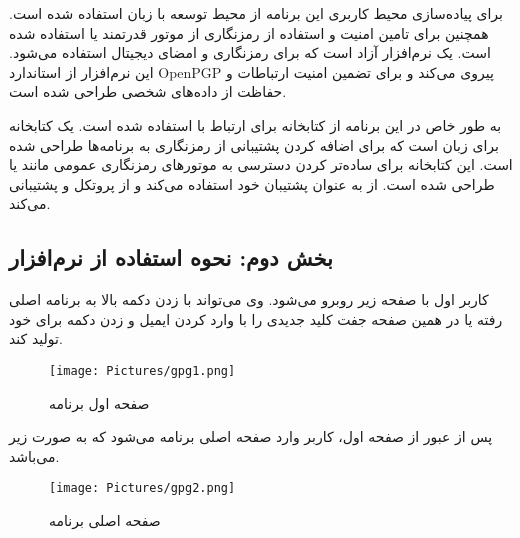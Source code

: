 \documentclass{report}
\begin{document}
برای پیاده‌سازی محیط کاربری این برنامه از محیط توسعه  با زبان  استفاده شده است. همچنین برای تامین امنیت و استفاده از رمزنگاری از موتور قدرتمند  یا  استفاده شده است.  یک نرم‌افزار آزاد است که برای رمزنگاری و امضای دیجیتال استفاده می‌شود. این نرم‌افزار از استاندارد OpenPGP پیروی می‌کند و برای تضمین امنیت ارتباطات و حفاظت از داده‌های شخصی طراحی شده است.

به طور خاص در این برنامه از کتابخانه  برای ارتباط با  استفاده شده است.
یک کتابخانه برای زبان  است که برای اضافه کردن پشتیبانی از رمزنگاری به برنامه‌ها طراحی شده است. این کتابخانه برای ساده‌تر کردن دسترسی به موتورهای رمزنگاری عمومی مانند  یا  طراحی شده است.  از  به عنوان پشتیبان خود استفاده می‌کند و از پروتکل  و 
 پشتیبانی می‌کند.
 
\subsection*{بخش دوم: نحوه استفاده از نرم‌افزار}

کاربر اول با صفحه زیر روبرو می‌شود. وی می‌تواند با زدن دکمه بالا به برنامه اصلی رفته یا در همین صفحه جفت کلید جدیدی را با وارد کردن ایمیل و زدن دکمه  برای خود تولید کند.
\begin{figure}[H]
    \centering
    \texttt{[image: Pictures/gpg1.png]} 
    \caption{صفحه اول برنامه}
    \label{figGPG1}
\end{figure}


پس از عبور از صفحه اول، کاربر وارد صفحه اصلی برنامه می‌شود که به صورت زیر می‌باشد.
\begin{figure}[H]
    \centering
    \texttt{[image: Pictures/gpg2.png]} 
    \caption{صفحه اصلی برنامه}
    \label{figGPG2}
\end{figure}
\end{document}

